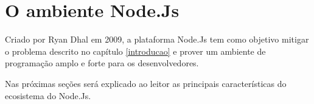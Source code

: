 \chapter{O ambiente Node.Js}
\label{ambiente-node-js}

\vspace{-1.9cm}



  
  
  

  Criado por Ryan Dhal em 2009, a plataforma Node.Js tem como objetivo mitigar o problema descrito no capítulo \ref{introducao}
  e prover um ambiente de programação amplo e forte para os desenvolvedores. 
  
  Nas próximas seções será explicado ao leitor as principais características do ecosistema do Node.Js.
 
  
  
  
